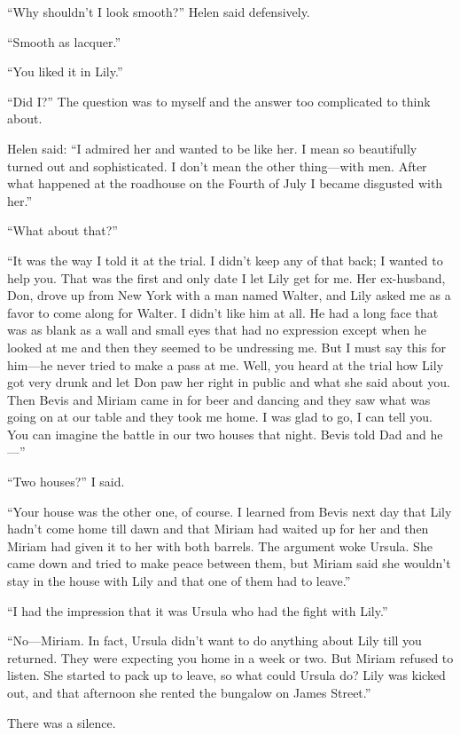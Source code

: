 \documentclass{novel}
\begin{document}
“Why shouldn’t I look smooth?” Helen said defensively.

“Smooth as lacquer.”

“You liked it in Lily.”

“Did I?” The question was to myself and the answer too complicated to think about.

Helen said: “I admired her and wanted to be like her. I mean so beautifully turned out and sophisticated. I don’t mean the other thing—with men. After what happened at the roadhouse on the Fourth of July I became disgusted with her.”

“What about that?”

\scenestars

“It was the way I told it at the trial. I didn’t keep any of that back; I wanted to help you. That was the first and only date I let Lily get for me. Her ex-husband, Don, drove up from New York with a man named Walter, and Lily asked me as a favor to come along for Walter. I didn’t like him at all. He had a long face that was as blank as a wall and small eyes that had no expression except when he looked at me and then they seemed to be undressing me. But I must say this for him—he never tried to make a pass at me. Well, you heard at the trial how Lily got very drunk and let Don paw her right in public and what she said about you. Then Bevis and Miriam came in for beer and dancing and they saw what was going on at our table and they took me home. I was glad to go, I can tell you. You can imagine the battle in our two houses that night. Bevis told Dad and he—”

“Two houses?” I said.

“Your house was the other one, of course. I learned from Bevis next day that Lily hadn’t come home till dawn and that Miriam had waited up for her and then Miriam had given it to her with both barrels. The argument woke Ursula. She came down and tried to make peace between them, but Miriam said she wouldn’t stay in the house with Lily and that one of them had to leave.”

“I had the impression that it was Ursula who had the fight with Lily.”

“No—Miriam. In fact, Ursula didn’t want to do anything about Lily till you returned. They were expecting you home in a week or two. But Miriam refused to listen. She started to pack up to leave, so what could Ursula do? Lily was kicked out, and that afternoon she rented the bungalow on James Street.”

There was a silence.
\end{document}
